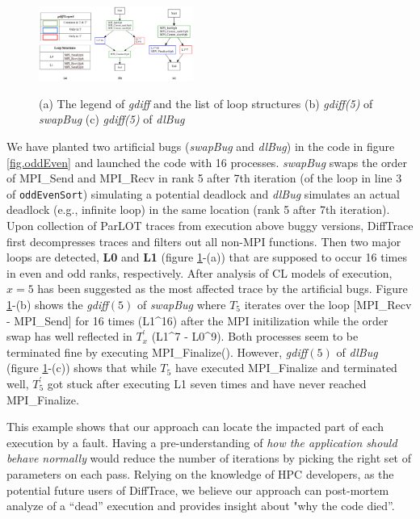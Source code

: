 \begin{figure}[]
\centering
\caption{(a) The legend of \textit{gdiff} and the list of loop structures (b) \textit{gdiff(5)} of \textit{swapBug} (c) \textit{gdiff(5)} of \textit{dlBug}}
\includegraphics[width=0.45\textwidth]{figs/sampleGdiff.png}
\label{fig.gdiffs}
\end{figure}

%
We have planted two artificial bugs (\textit{swapBug} and \textit{dlBug}) in the code in figure \ref{fig.oddEven} and launched the code with 16 processes.
%
\textit{swapBug} swaps the order of MPI\_Send and MPI\_Recv in rank 5 after 7th iteration (of the loop in line 3 of \texttt{oddEvenSort}) simulating a potential deadlock and \textit{dlBug} simulates an actual deadlock (e.g., infinite loop) in the same location (rank 5 after 7th iteration).
%
Upon collection of ParLOT traces from execution above buggy versions, DiffTrace first decompresses traces and filters out all non-MPI functions.
Then two major loops are detected, \textbf{L0} and \textbf{L1}  (figure \ref{fig.gdiffs}-(a)) that are supposed to occur 16 times in even and odd ranks, respectively.
After analysis of CL models of execution, $x=5$ has been suggested as the most affected trace by the artificial bugs.
Figure \ref{fig.gdiffs}-(b) shows the 
\textit{gdiff}$(5)$ of \textit{swapBug} where $T_5$ iterates over the loop [MPI\_Recv - MPI\_Send] for 16 times (L1\^{}16) after the MPI initilization while the order swap has well reflected in $T_x^\prime$ (L1\^{}7 - L0\^{}9). Both processes seem to be terminated fine by executing MPI\_Finalize(). 
However, \textit{gdiff}$(5)$ of \textit{dlBug} (figure \ref{fig.gdiffs}-(c)) shows that while $T_5$ have executed MPI\_Finalize and terminated well, $T_5^\prime$ got stuck after executing L1 seven times and have never reached MPI\_Finalize.

This example shows that our approach can locate the impacted part of each execution by a fault. Having a pre-understanding of \textit{how the application should behave normally} would reduce the number of iterations by picking the right set of parameters on each pass. Relying on the knowledge of HPC developers, as the potential future users of DiffTrace, we believe our approach can post-mortem analyze of a ``dead'' execution and provides insight about "why the code died''.






